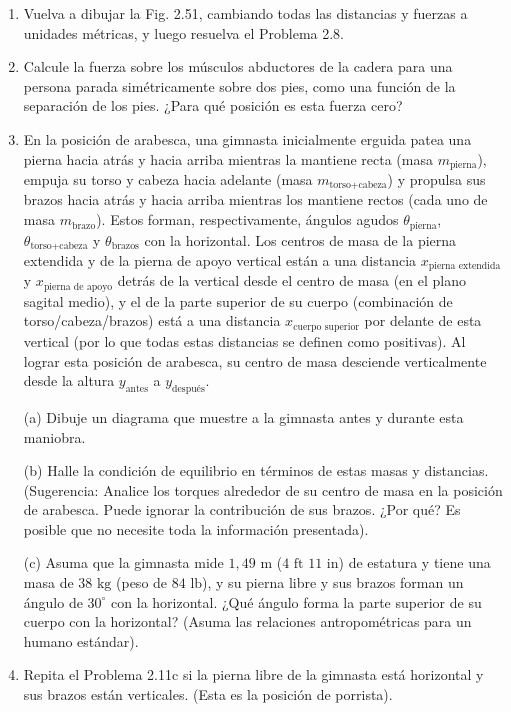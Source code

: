 \documentclass[12pt]{book}
\begin{document}
\begin{enumerate}
\item[2.9] Vuelva a dibujar la Fig. 2.51, cambiando todas las distancias y fuerzas a unidades métricas, y luego resuelva el Problema 2.8.

\item[2.10] Calcule la fuerza sobre los músculos abductores de la cadera para una persona parada simétricamente sobre dos pies, como una función de la separación de los pies. ¿Para qué posición es esta fuerza cero?

\item[2.11] En la posición de arabesca, una gimnasta inicialmente erguida patea una pierna hacia atrás y hacia arriba mientras la mantiene recta (masa $m_{\text{pierna}}$), empuja su torso y cabeza hacia adelante (masa $m_{\text{torso+cabeza}}$) y propulsa sus brazos hacia atrás y hacia arriba mientras los mantiene rectos (cada uno de masa $m_{\text{brazo}}$). Estos forman, respectivamente, ángulos agudos $\theta_{\text{pierna}}$, $\theta_{\text{torso+cabeza}}$ y $\theta_{\text{brazos}}$ con la horizontal. Los centros de masa de la pierna extendida y de la pierna de apoyo vertical están a una distancia $x_{\text{pierna extendida}}$ y $x_{\text{pierna de apoyo}}$ detrás de la vertical desde el centro de masa (en el plano sagital medio), y el de la parte superior de su cuerpo (combinación de torso/cabeza/brazos) está a una distancia $x_{\text{cuerpo superior}}$ por delante de esta vertical (por lo que todas estas distancias se definen como positivas). Al lograr esta posición de arabesca, su centro de masa desciende verticalmente desde la altura $y_{\text{antes}}$ a $y_{\text{después}}$.

(a) Dibuje un diagrama que muestre a la gimnasta antes y durante esta maniobra.

(b) Halle la condición de equilibrio en términos de estas masas y distancias. (Sugerencia: Analice los torques alrededor de su centro de masa en la posición de arabesca. Puede ignorar la contribución de sus brazos. ¿Por qué? Es posible que no necesite toda la información presentada).

(c) Asuma que la gimnasta mide $1,49\text{ m}$ ($4\text{ ft } 11\text{ in}$) de estatura y tiene una masa de $38\text{ kg}$ (peso de $84\text{ lb}$), y su pierna libre y sus brazos forman un ángulo de $30^\circ$ con la horizontal. ¿Qué ángulo forma la parte superior de su cuerpo con la horizontal? (Asuma las relaciones antropométricas para un humano estándar).

\item[2.12] Repita el Problema 2.11c si la pierna libre de la gimnasta está horizontal y sus brazos están verticales. (Esta es la posición de porrista).


\end{enumerate}
\end{document}
